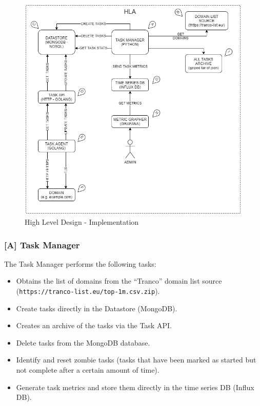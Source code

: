 \documentclass{mscreport}
\begin{document}
\begin{figure}[h!]
	\begin{center}
		\includegraphics[scale=0.65]{../images/HLA_Implementation_v1_Entites.png} 
		\caption{High Level Design - Implementation}
		\label{fig:hla_design_implmementation}
	\end{center}
\end{figure}

\clearpage

\newpage

\subsubsection{[A] Task Manager}

The Task Manager performs the following tasks:

\begin{itemize}
	\setlength\itemsep{0.1em}
    \item Obtains the list of domains from the ``Tranco'' domain list source \newline (\texttt{https://tranco-list.eu/top-1m.csv.zip}).
    \item Create tasks directly in the Datastore (MongoDB).
    \item Creates an archive of the tasks via the Task API.
    \item Delete tasks from the MongoDB database.
    \item Identify and reset zombie tasks (tasks that have been marked as started but not complete after a certain amount of time).
    \item Generate task metrics and store them directly in the time series DB (Influx DB).
\end{itemize}
\end{document}
